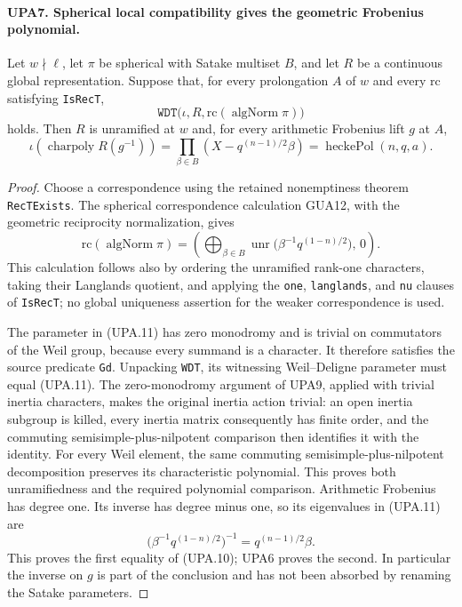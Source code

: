 \documentclass[11pt,a4paper]{article}
\numberwithin{equation}{section}
\theoremstyle{remark}\newtheorem{remark}[theorem]{Remark}
\begin{document}
\paragraph{UPA7. Spherical local compatibility gives the geometric Frobenius polynomial.}
\label{claim:UPA7}
Let $w\nmid\ell$, let $\pi$ be spherical with Satake multiset
$B$, and let $R$ be a continuous global representation.
Suppose that, for every prolongation $A$ of $w$ and every
$\mathrm{rc}$ satisfying \texttt{Is\allowbreak Rec\allowbreak T},
\[
 \texttt{WDT}\bigl(\iota,R,\mathrm{rc}(\operatorname{algNorm}\pi)\bigr)
 \tag{UPA.9}
\]
holds.  Then $R$ is unramified at $w$ and, for every
arithmetic Frobenius lift $g$ at $A$,
\[
 \iota\!\left(\operatorname{charpoly}R(g^{-1})\right)
       =\prod_{\beta\in B}(X-q^{(n-1)/2}\beta)
       =\operatorname{heckePol}(n,q,a).
 \tag{UPA.10}
\]
\begin{proof}
Choose a correspondence using the retained nonemptiness theorem
\texttt{Rec\allowbreak TExists}.  The spherical correspondence calculation
GUA12, with the geometric reciprocity
normalization, gives
\[
 \mathrm{rc}(\operatorname{algNorm}\pi)
   =\left(\bigoplus_{\beta\in B}\operatorname{unr}
       \bigl(\beta^{-1}q^{(1-n)/2}\bigr),\,0\right).
 \tag{UPA.11}
\]
This calculation follows also by ordering the unramified
rank-one characters, taking their Langlands quotient, and
applying the \texttt{one}, \texttt{langlands}, and
\texttt{nu} clauses of \texttt{Is\allowbreak Rec\allowbreak T}; no global uniqueness
assertion for the weaker correspondence is used.

The parameter in (UPA.11) has zero monodromy and is trivial
on commutators of the Weil group, because every summand is
a character.  It therefore satisfies the source predicate
\texttt{Gd}.  Unpacking \texttt{WDT}, its witnessing
Weil--Deligne parameter must equal (UPA.11).
The zero-monodromy argument of UPA9, applied with trivial inertia
characters, makes the original inertia action trivial: an open
inertia subgroup is killed, every inertia matrix consequently has
finite order, and the commuting semisimple-plus-nilpotent comparison
then identifies it with the identity.  For every Weil element, the
same commuting semisimple-plus-nilpotent decomposition preserves
its characteristic polynomial.  This proves both unramifiedness
and the required polynomial comparison.  Arithmetic Frobenius
has degree one.  Its inverse has degree minus one, so its
eigenvalues in (UPA.11) are
\[
       \bigl(\beta^{-1}q^{(1-n)/2}\bigr)^{-1}
                          =q^{(n-1)/2}\beta.
\]
This proves the first equality of (UPA.10); UPA6 proves
the second.  In particular the inverse on $g$ is part of
the conclusion and has not been absorbed by renaming the
Satake parameters.
\end{proof}
\end{document}
